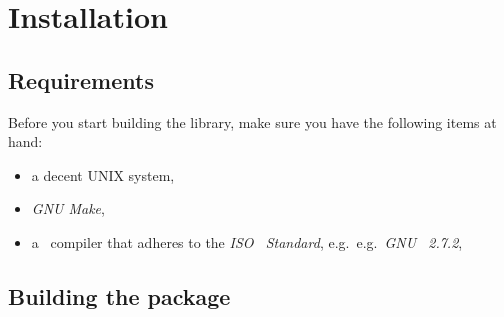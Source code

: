 %
%
% 
% 
% 
% 
%

\section{Installation}

\subsection{Requirements}

Before you start building the library, make sure you have the following items
at hand:
\begin{itemize}
\item a decent UNIX system,
\item \emph{GNU Make},
\item a \CC\ compiler that adheres to the \emph{ISO \CC\ Standard}, e.g.\
    e.g.\ \emph{GNU \CC\ 2.7.2},
\end{itemize}

\subsection{Building the package}


